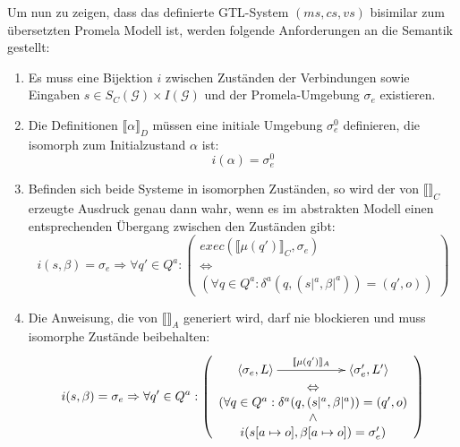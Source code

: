 Um nun zu zeigen, dass das definierte GTL-System $(ms,cs,vs)$ bisimilar zum übersetzten Promela Modell ist, werden folgende Anforderungen an die Semantik gestellt:
\begin{enumerate}
\label{sec:bijection_conditions}
\item Es muss eine Bijektion $i$ zwischen Zuständen der Verbindungen sowie Eingaben $s\in S_C(\mathcal{G})\times I(\mathcal{G})$ und der Promela-Umgebung $\sigma_e$ existieren.
\item Die Definitionen $\llbracket \alpha \rrbracket_D$ müssen eine initiale Umgebung $\sigma_e^0$ definieren, die isomorph zum Initialzustand $\alpha$ ist: 
  \begin{equation}
    i(\alpha) = \sigma_e^0
    \label{eq:assert0}
  \end{equation}
\item Befinden sich beide Systeme in isomorphen Zuständen, so wird der von $\llbracket \rrbracket_C$ erzeugte Ausdruck genau dann wahr, wenn es im abstrakten Modell einen entsprechenden Übergang zwischen den Zuständen gibt:
  \begin{equation}
    i(s,\beta) = \sigma_e \Rightarrow \forall q'\in Q^a: \left(
      \begin{array}{c}
        \mathit{exec}(\llbracket \mu(q')\rrbracket_C,\sigma_e) \\
        \Leftrightarrow\\
        (\forall q\in Q^a: \delta^a(q,(s|^a,\beta|^a))=(q',o))
    \end{array}\right)
    \label{eq:assert1}
  \end{equation}
\item Die Anweisung, die von $\llbracket \rrbracket_A$ generiert wird, darf nie blockieren und muss isomorphe Zustände beibehalten:
  \begin{equation}
    i(s,\beta) = \sigma_e \Rightarrow \forall q'\in Q^a: \left(
      \begin{array}{c}
        \xymatrix{ \left<\sigma_e,L\right> \ar[rr]^-{\llbracket \mu(q')\rrbracket_A} & & \left<\sigma_e',L'\right> } \\
        \Leftrightarrow\\
        (\forall q\in Q^a: \delta^a(q,(s|^a,\beta|^a)) = (q',o)\\
        \land\\
        i(s[a\mapsto o],\beta[a\mapsto o]) = \sigma_e')
      \end{array}\right)
     \label{eq:assert2}
  \end{equation}
\end{enumerate}
